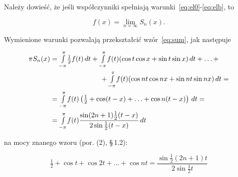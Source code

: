 \documentclass[leqno]{book}
\newcommand{\parsign}[0]{\S\,}
\begin{document}
    Należy dowieść, że jeśli współczynniki spełniają warunki~\eqref{eq:el0}-\eqref{eq:elb}, to

    \begin{equation}
        \label{eq:fS}
        f(x) = \lim_{n = \infty} S_n(x) \text{.}
    \end{equation}

    Wymienione warunki pozwalają przekształcić wzór~\eqref{eq:sum}, jak następuje

    \begin{gather}
        \begin{align}
            \pi S_n(x) & = \mathsmaller{\int\limits_{-\pi}^{\pi}} \tfrac{1}{2} f(t) \,dt + \mathsmaller{\int\limits_{-\pi}^{\pi}} f(t)(\cos t \cos x + \sin t \sin x) \,dt +
            \ldots + \\
            & \kern 6pc + \mathsmaller{\int\limits_{-\pi}^{\pi}} f(t)(\cos nt \cos nx + \sin nt \sin nx) \,dt = \notag\\
            & = \mathsmaller{\int\limits_{-\pi}^{\pi}} f(t)\left(\tfrac{1}{2} + \cos (t -x) + \ldots + \cos n(t - x)\right) \,dt = \notag\\
            & = \mathsmaller{\int\limits_{-\pi}^{\pi}} f(t) \frac{\sin (2n + 1) \frac{1}{2} (t - x)}{2 \sin \frac{1}{2} (t - x)} \,dt \notag
        \end{align}
        \raisetag{3\baselineskip}
    \end{gather}

    na mocy znanego wzoru (por. (2), \parsign 1.2):

    \[
        \tfrac{1}{2} + \cos t + \cos 2t + \ldots + \cos nt = \frac{\sin \frac{1}{2} (2n + 1) t}{2 \sin \frac{1}{2} t}
    \]
\end{document}
